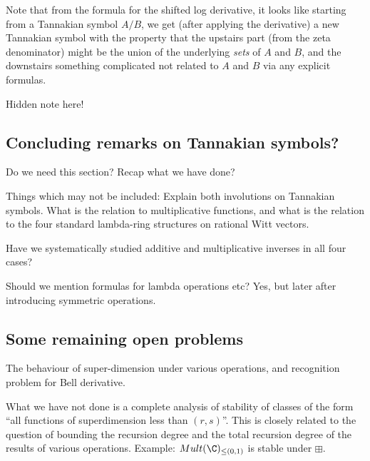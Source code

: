 \documentclass[a4paper]{article}
\begin{document}
Note that from the formula for the shifted log derivative, it looks like starting from a Tannakian symbol $A/B$, we get (after applying the derivative) a new Tannakian symbol with the property that the upstairs part (from the zeta denominator) might be the union of the underlying \emph{sets} of $A$ and $B$, and the downstairs something complicated not related to $A$ and $B$ via any explicit formulas. 


Hidden note here!





\subsection{Concluding remarks on Tannakian symbols?}

Do we need this section? Recap what we have done?

Things which may not be included: Explain both involutions on Tannakian symbols. What is the relation to multiplicative functions, and what is the relation to the four standard lambda-ring structures on rational Witt vectors.

Have we systematically studied additive and multiplicative inverses in all four cases?

Should we mention formulas for lambda operations etc? Yes, but later after introducing symmetric operations.


\subsection{Some remaining open problems}

The behaviour of super-dimension under various operations, and recognition problem for Bell derivative.

What we have not done is a complete analysis of stability of classes of the form ``all functions of superdimension less than $(r, s)$''. This is closely related to the question of bounding the recursion degree and the total recursion degree of the results of various operations. Example: $Mult(\C)_{\leq (0, 1)}$ is stable under $\boxplus$.
\end{document}
